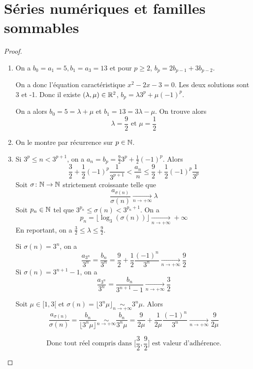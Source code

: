 \section{Séries numériques et familles sommables}

\begin{proof}
	\phantom{}
	\begin{enumerate}
		\item On a $b_{0}=a_{1}=5,b_{1}=a_{3}=13$ et pour $p\geqslant2$, $b_{p}=2b_{p-1}+3b_{p-2}$.
		
		On a donc l'équation caractéristique $x^{2}-2x-3=0$. Les deux solutions sont 3 et -1. Donc il existe $(\lambda,\mu)\in\mathbb{R}^{2}$, $b_{p}=\lambda 3^{p}+\mu(-1)^{p}$.

		On a alors $b_{0}=5=\lambda+\mu$ et $b_{1}=13=3\lambda-\mu$. On trouve alors 
		$$\boxed{\lambda=\frac{9}{2} \text{ et } \mu=\frac{1}{2}}$$

		\item On le montre par récurrence sur $p\in\mathbb{N}$.
		
		\item Si $3^{p}\leqslant n<3^{p+1}$, on a $a_{n}=b_{p}=\frac{9}{2}3^{p}+\frac{1}{2}(-1)^{p}$.
		Alors 
		$$\frac{3}{2}+\frac{1}{2}(-1)^{p}\frac{1}{3^{p+1}}<\frac{a_{n}}{n}\leqslant\frac{9}{2}+\frac{1}{2}(-1)^{p}\frac{1}{3^{p}}$$
		Soit $\sigma\colon\mathbb{N}\to\mathbb{N}$ strictement croissante telle que 
		$$\frac{a_{\sigma(n)}}{\sigma(n)}\xrightarrow[n\to+\infty]{}\lambda$$
		Soit $p_{n}\in\mathbb{N}$ tel que $3^{p_{n}}\leqslant\sigma(n)<3^{p_{n}+1}$. On a 
		$$p_{n}=\bigl\lfloor\log_{3}(\sigma(n))\bigr\rfloor\xrightarrow[n\to+\infty]{}+\infty$$
		En reportant, on a $\frac{3}{2}\leqslant\lambda\leqslant\frac{9}{2}$.

		Si $\sigma(n)=3^{n}$, on a 
		$$\frac{a_{3^{n}}}{3^{n}}=\frac{b_{n}}{3^{n}}=\frac{9}{2}+\frac{1}{2}\frac{(-1)^{n}}{3^{n}}\xrightarrow[n\to+\infty]{}\frac{9}{2}$$
		Si $\sigma(n)=3^{n+1}-1$, on a 
		$$\frac{a_{3^{n}}}{3^{n}}=\frac{b_{n}}{3^{n+1}-1}\xrightarrow[n\to+\infty]{}\frac{3}{2}$$

		Soit $\mu\in[1,3[$ et $\sigma(n)=\lfloor 3^{n}\mu\rfloor\underset{n\to+\infty}{\sim}3^{n}\mu$. Alors 
		$$\frac{a_{\sigma(n)}}{\sigma(n)}=\frac{b_{n}}{\lfloor3^{n}\mu\rfloor}\underset{n\to+\infty}{\sim}\frac{b_{n}}{3^{n}\mu}=\frac{9}{2\mu}+\frac{1}{2\mu}\frac{(-1)^{n}}{3^{n}}\xrightarrow[n\to+\infty]{}\frac{9}{2\mu}$$
		
		$$\boxed{\text{Donc tout réel compris dans } \Biggl[\frac{3}{2},\frac{9}{2}\Biggr] \text{ est valeur d'adhérence.}}$$
	\end{enumerate}
\end{proof}

